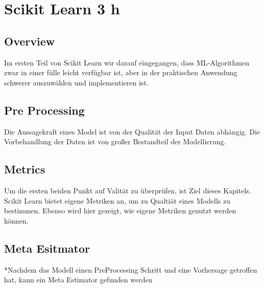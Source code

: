\section{Scikit Learn 3 h}
\subsection{Overview}
Im ersten Teil von Scikit Learn wir darauf eingegangen, dass ML-Algorithmen zwar in einer fülle leicht verfügbar ist, aber in der praktischen Anwendung schwerer auszuwählen und implementieren ist.
\subsection{Pre Processing}
Die Aussagekraft eines Model ist von der Qualität der Input Daten abhängig. Die Vorbehandlung der Daten ist von großer Bestandteil der Modellierung.

\subsection{Metrics}
Um die ersten beiden Punkt auf Valität zu überprüfen, ist Ziel dieses Kapitels. Scikit Learn bietet eigene Metriken an, um zu Qualtiät eines Modells zu bestimmen. Ebenso wird hier gezeigt, wie eigene Metriken genutzt werden können.

\subsection{Meta Esitmator}
*Nachdem das Modell einen PreProcessing Schritt und eine Vorhersage getroffen hat, kann ein Meta Estimator gefunden werden

